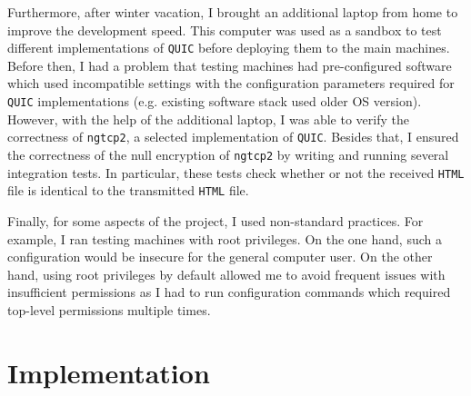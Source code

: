 \documentclass[12pt,a4paper,twoside,openright]{report}
\begin{document}
    Furthermore, after winter vacation, I brought an additional laptop from home to improve the development speed.
    This computer was used as a sandbox to test different implementations of \texttt{QUIC} before deploying them to the main machines.
    Before then, I had a problem that testing machines had pre-configured software which used incompatible settings with the configuration parameters required for \texttt{QUIC} implementations (e.g. existing software stack used older OS version).
    However, with the help of the additional laptop, I was able to verify the correctness of \texttt{ngtcp2}, a selected implementation of \texttt{QUIC}.
    Besides that, I ensured the correctness of the null encryption of \texttt{ngtcp2} by writing and running several integration tests.
    In particular, these tests check whether or not the received \texttt{HTML} file is identical to the transmitted \texttt{HTML} file.
    
    Finally, for some aspects of the project, I used non-standard practices.
    For example, I ran testing machines with root privileges.
    On the one hand, such a configuration would be insecure for the general computer user. On the other hand, using root privileges by default allowed me to avoid frequent issues with insufficient permissions as I had to run configuration commands which required top-level permissions multiple times.
    
    

\chapter{Implementation}



\end{document}
